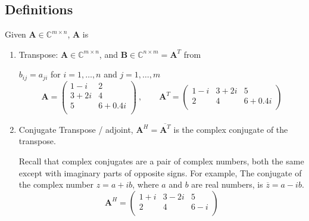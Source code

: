 \documentclass[12pt]{article}
\newcommand{\ve}[1]{\ensuremath{\mathbf{#1}}}
\newcommand{\cc}[1]{\ensuremath{\overline{#1}}}
\begin{document}
\subsection{Definitions}

Given $\ve{A} \in \mathbb{C}^{m \times n}$, \ve{A} is
%
\begin{enumerate}
\item Transpose: $\ve{A} \in \mathbb{C}^{m \times n}$, and $\ve{B} \in \mathbb{C}^{n \times m} = \ve{A}^T$ from

$b_{ij} = a_{ji}$ for $i = 1, \dots, n$ and $j = 1, \dots, m$
%
\newcommand{\aaa}{1-i}
\newcommand{\aab}{2}
\newcommand{\aba}{3+2i}
\newcommand{\abb}{4}
\newcommand{\aca}{5}
\newcommand{\acb}{6+0.4i}
%
\begin{equation}
\ve{A} = \begin{pmatrix}
   \aaa & \aab \\
   \aba & \abb \\
   \aca & \acb \\
\end{pmatrix}\:, \qquad 
%
\ve{A}^T = \begin{pmatrix}
   \aaa & \aba & \aca \\
   \aab & \abb & \acb \\
\end{pmatrix} \nonumber
\end{equation}

\item Conjugate Transpose / adjoint, $\ve{A}^H = \cc{\ve{A}^T}$ is the complex conjugate of the transpose. 

Recall that complex conjugates are a pair of complex numbers, both the same except with imaginary parts of opposite signs. For example, The conjugate of the complex number $z=a+ib$, where $a$ and $b$ are real numbers, is $\overline{z} = a - ib$.
\renewcommand{\aaa}{1+i}
\renewcommand{\aba}{3-2i}
\renewcommand{\acb}{6-i}
%
\begin{equation}
\ve{A}^H = \begin{pmatrix}
   \aaa & \aba & \aca \\
   \aab & \abb & \acb \\
\end{pmatrix} \nonumber
\end{equation}


\end{enumerate}
\end{document}
